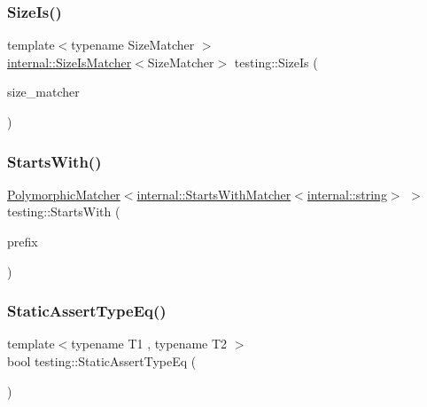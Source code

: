 \mbox{\label{namespacetesting_acd5e215558f95f1393c048a6d496060d}} 
\subsubsection{\texorpdfstring{Size\+Is()}{SizeIs()}}
{\footnotesize\ttfamily template$<$typename Size\+Matcher $>$ \\
\hyperlink{classtesting_1_1internal_1_1_size_is_matcher}{internal\+::\+Size\+Is\+Matcher}$<$Size\+Matcher$>$ testing\+::\+Size\+Is (\begin{DoxyParamCaption}\item[{const Size\+Matcher \&}]{size\+\_\+matcher }\end{DoxyParamCaption})\hspace{0.3cm}{\ttfamily [inline]}}

\mbox{\label{namespacetesting_ae0502232432b1fe8361d296c6de6beda}} 
\subsubsection{\texorpdfstring{Starts\+With()}{StartsWith()}}
{\footnotesize\ttfamily \hyperlink{classtesting_1_1_polymorphic_matcher}{Polymorphic\+Matcher}$<$\hyperlink{classtesting_1_1internal_1_1_starts_with_matcher}{internal\+::\+Starts\+With\+Matcher}$<$\hyperlink{namespacetesting_1_1internal_a8e8ff5b11e64078831112677156cb111}{internal\+::string}$>$ $>$ testing\+::\+Starts\+With (\begin{DoxyParamCaption}\item[{const \hyperlink{namespacetesting_1_1internal_a8e8ff5b11e64078831112677156cb111}{internal\+::string} \&}]{prefix }\end{DoxyParamCaption})\hspace{0.3cm}{\ttfamily [inline]}}

\mbox{\label{namespacetesting_a661e70fc6afeb5c085eed3716aa45059}} 
\subsubsection{\texorpdfstring{Static\+Assert\+Type\+Eq()}{StaticAssertTypeEq()}}
{\footnotesize\ttfamily template$<$typename T1 , typename T2 $>$ \\
bool testing\+::\+Static\+Assert\+Type\+Eq (\begin{DoxyParamCaption}{ }\end{DoxyParamCaption})}

